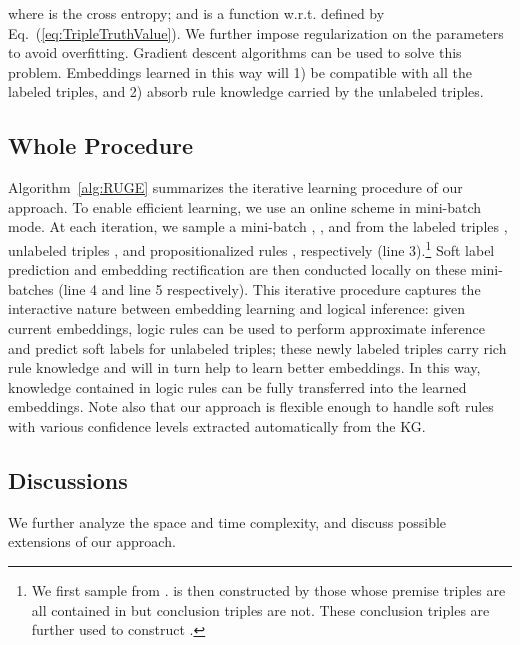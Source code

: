 \documentclass[letterpaper]{article} \usepackage{aaai18}  \usepackage{times}  \usepackage{helvet}  \usepackage{courier}  \usepackage{url}  \usepackage{graphicx}  \usepackage{amsmath}
\begin{document}
where  is the cross entropy; and  is a function w.r.t.  defined by Eq.~(\ref{eq:TripleTruthValue}). We further impose  regularization on the parameters  to avoid overfitting. Gradient descent algorithms can be used to solve this problem. Embeddings learned in this way will 1) be compatible with all the labeled triples, and 2) absorb rule knowledge carried by the unlabeled triples.

\subsection{Whole Procedure}
Algorithm~\ref{alg:RUGE} summarizes the iterative learning procedure of our approach. To enable efficient learning, we use an online scheme in mini-batch mode. At each iteration, we sample a mini-batch , , and  from the labeled triples , unlabeled triples , and propositionalized rules , respectively (line 3).\footnote{We first sample  from .  is then constructed by those whose premise triples are all contained in  but conclusion triples are not. These conclusion triples are further used to construct .} Soft label prediction and embedding rectification are then conducted locally on these mini-batches (line 4 and line 5 respectively). This iterative procedure captures the interactive nature between embedding learning and logical inference: given current embeddings, logic rules can be used to perform approximate inference and predict soft labels for unlabeled triples; these newly labeled triples carry rich rule knowledge and will in turn help to learn better embeddings. In this way, knowledge contained in logic rules can be fully transferred into the learned embeddings. Note also that our approach is flexible enough to handle soft rules with various confidence levels extracted automatically from the KG.


\subsection{Discussions}
We further analyze the space and time complexity, and discuss possible extensions of our approach.
\end{document}

